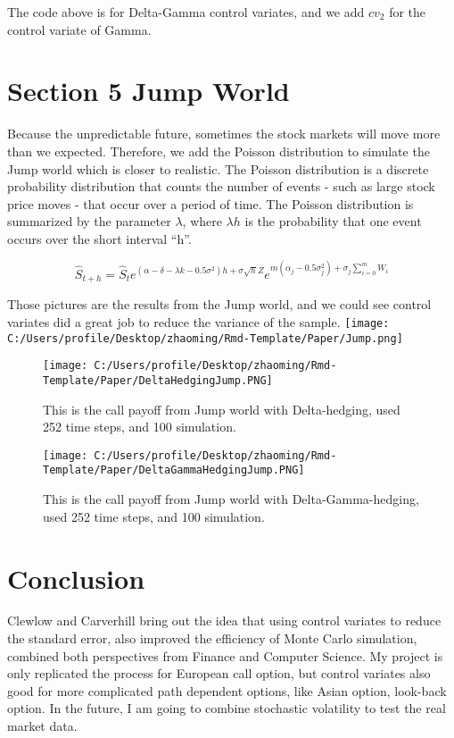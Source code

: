 \documentclass[11pt,]{article}
\makeatletter
\def\maxwidth{\ifdim\Gin@nat@width>\linewidth\linewidth
\else\Gin@nat@width\fi}
\let\Oldincludegraphics\includegraphics
\renewcommand{\includegraphics}[1]{\Oldincludegraphics[width=\maxwidth]{#1}}
\makeatother
\begin{document}
The code above is for Delta-Gamma control variates, and we add \(cv_2\)
for the control variate of Gamma.

\hypertarget{section-5-jump-world}{%
\section{Section 5 Jump World}\label{section-5-jump-world}}

Because the unpredictable future, sometimes the stock markets will move
more than we expected. Therefore, we add the Poisson distribution to
simulate the Jump world which is closer to realistic. The Poisson
distribution is a discrete probability distribution that counts the
number of events - such as large stock price moves - that occur over a
period of time. The Poisson distribution is summarized by the parameter
\(\lambda\), where \(\lambda h\) is the probability that one event
occurs over the short interval ``h''.

\[
\hat{S}_{t+h} = \hat{S}_te^{(\alpha-\delta-\lambda k - 0.5\sigma^2)h+\sigma\sqrt hZ}e^{m(\alpha_j-0.5\sigma^2_j)+\sigma_j\sum^m_{i=0}W_i}
\]

Those pictures are the results from the Jump world, and we could see
control variates did a great job to reduce the variance of the sample.
\texttt{[image: C:/Users/profile/Desktop/zhaoming/Rmd-Template/Paper/Jump.png]}

\begin{figure}
\centering
\texttt{[image: C:/Users/profile/Desktop/zhaoming/Rmd-Template/Paper/DeltaHedgingJump.PNG]}
\caption{This is the call payoff from Jump world with Delta-hedging,
used 252 time steps, and 100 simulation.}
\end{figure}

\begin{figure}
\centering
\texttt{[image: C:/Users/profile/Desktop/zhaoming/Rmd-Template/Paper/DeltaGammaHedgingJump.PNG]}
\caption{This is the call payoff from Jump world with
Delta-Gamma-hedging, used 252 time steps, and 100 simulation.}
\end{figure}

\hypertarget{conclusion}{%
\section{Conclusion}\label{conclusion}}

Clewlow and Carverhill bring out the idea that using control variates to
reduce the standard error, also improved the efficiency of Monte Carlo
simulation, combined both perspectives from Finance and Computer
Science. My project is only replicated the process for European call
option, but control variates also good for more complicated path
dependent options, like Asian option, look-back option. In the future, I
am going to combine stochastic volatility to test the real market data.

\newpage
\singlespacing 

\end{document}
